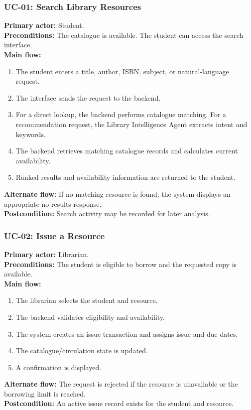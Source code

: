 \documentclass[12pt,a4paper]{report}
\begin{document}
\subsubsection{UC-01: Search Library Resources}
\textbf{Primary actor:} Student.\\
\textbf{Preconditions:} The catalogue is available. The student can access the search interface.\\
\textbf{Main flow:}
\begin{enumerate}
\item The student enters a title, author, ISBN, subject, or natural-language request.
\item The interface sends the request to the backend.
\item For a direct lookup, the backend performs catalogue matching. For a recommendation request, the Library Intelligence Agent extracts intent and keywords.
\item The backend retrieves matching catalogue records and calculates current availability.
\item Ranked results and availability information are returned to the student.
\end{enumerate}
\textbf{Alternate flow:} If no matching resource is found, the system displays an appropriate no-results response.\\
\textbf{Postcondition:} Search activity may be recorded for later analysis.

\subsubsection{UC-02: Issue a Resource}
\textbf{Primary actor:} Librarian.\\
\textbf{Preconditions:} The student is eligible to borrow and the requested copy is available.\\
\textbf{Main flow:}
\begin{enumerate}
\item The librarian selects the student and resource.
\item The backend validates eligibility and availability.
\item The system creates an issue transaction and assigns issue and due dates.
\item The catalogue/circulation state is updated.
\item A confirmation is displayed.
\end{enumerate}
\textbf{Alternate flow:} The request is rejected if the resource is unavailable or the borrowing limit is reached.\\
\textbf{Postcondition:} An active issue record exists for the student and resource.
\end{document}
